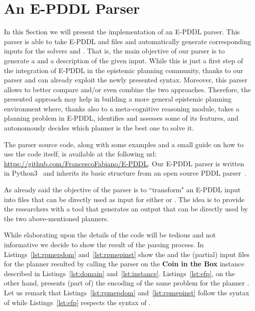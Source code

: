 \section{An E-PDDL Parser}
In this Section we will present the implementation of an E-PDDL parser.
This parser is able to take E-PDDL \probdom and \probinst files and automatically generate corresponding inputs for the solvers \rpmep and \EFP.
That is, the main objective of our parser is to generate a \pdkbpddl and a \mar description of the given input.
While this is just a first step of the integration of E-PDDL in the epistemic planning community, thanks to our parser  \rpmep and \EFP can already exploit the newly presented syntax.
Moreover, this parser allows to better compare and/or even combine the two approaches.
Therefore, the presented approach may help in building a more general epistemic planning environment where, thanks also to a meta-cognitive reasoning module, takes a planning problem in E-PDDL, identifies and assesses some of its features, and autonomously decides which planner is the best one to solve it.

The parser source code, along with some examples and a small guide on how to use the code itself, is available at the following url: \url{https://github.com/FrancescoFabiano/E-PDDL}.
Our E-PDDL parser is written in Python3~\cite{10.5555/1593511} and inherits its basic structure from an open source PDDL parser~\cite{pddlparser}.

As already said the objective of the parser is to ``transform" an E-PDDL input into files that can be directly used as input for either \rpmep or \EFP.
The idea is to provide the researchers with a tool that generates an output that can be directly used by the two above-mentioned planners. 

While elaborating upon the details of the code will be tedious and not informative we decide to show the result of the parsing process.
In Listings~\ref{lst:rpmepdom} and~\ref{lst:rpmepinst} show the \probdom and the \probinst (partial) input files for the planner \rpmep resulted by calling the parser on the \textbf{Coin in the Box} instance described in Listings~\ref{lst:domain} and~\ref{lst:instance}.
Listings~\ref{lst:efp}, on the other hand, presents (part of) the encoding of the same problem for the planner \mar.
Let us remark that Listings~\ref{lst:rpmepdom} and~\ref{lst:rpmepinst} follow the syntax of \pdkbpddl while Listings~\ref{lst:efp} respects the syntax of \mar.

